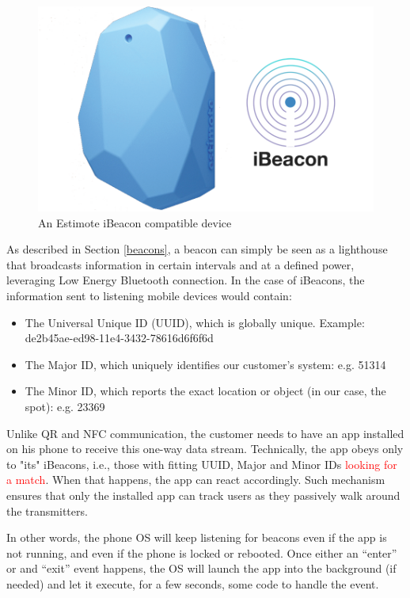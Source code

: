 \vspace{0.5cm}
\begin{figure}[H]
  \centering
    \includegraphics[width=16cm]{images/ibeacon.png}
  \caption{An Estimote iBeacon compatible device}
  \label{fig:estimote-beacon}
\end{figure}
\vspace{0.5cm}

As described in Section \ref{beacons}, a beacon can simply be seen as a lighthouse that broadcasts information in certain intervals and at a defined power, leveraging Low Energy Bluetooth connection. In the case of iBeacons, the information sent to listening mobile devices would contain:


\begin{itemize}
  \item The Universal Unique ID (UUID), which is globally unique. Example: de2b45ae-ed98-11e4-3432-78616d6f6f6d
  \item The Major ID, which uniquely identifies our customer’s system: e.g. 51314
  \item The Minor ID, which reports the exact location or object (in our case, the spot): e.g. 23369
\end{itemize}

Unlike QR and NFC communication, the customer needs to have an app installed on his phone to receive this one-way data stream. Technically, the app obeys only to "its" iBeacons, i.e., those with fitting UUID, Major and Minor IDs \textcolor{red}{looking for a match}. When that happens, the app can react accordingly. Such mechanism ensures that only the installed app can track users as they passively walk around the transmitters. 

In other words, the phone OS will keep listening for beacons even if the app is not running, and even if the phone is locked or rebooted. Once either an “enter” or and “exit” event happens, the OS will launch the app into the background (if needed) and let it execute, for a few seconds, some code to handle the event.


